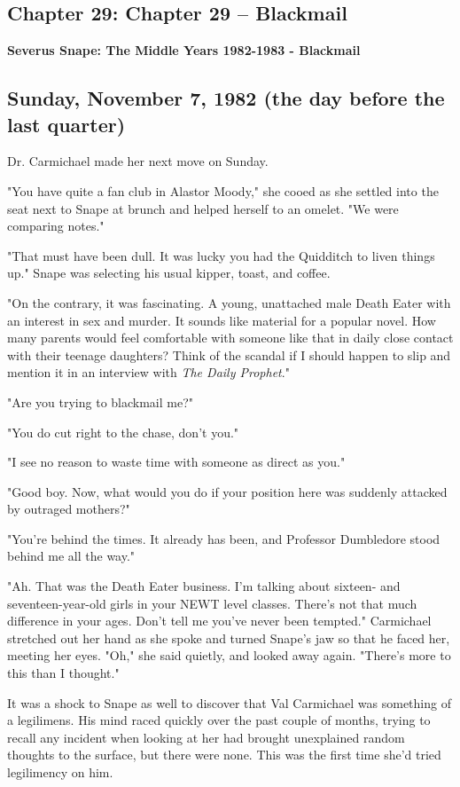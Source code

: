\documentclass[a4paper,11pt]{article}
\begin{document}
\subsection{Chapter 29: Chapter 29 – Blackmail}

\textbf{Severus Snape: The Middle Years 1982-1983 - Blackmail}

\subsection{Sunday, November 7, 1982 (the day before the last quarter)}

Dr. Carmichael made her next move on Sunday.

"You have quite a fan club in Alastor Moody," she cooed as she settled into the seat next to Snape at brunch and helped herself to an omelet. "We were comparing notes."

"That must have been dull. It was lucky you had the Quidditch to liven things up." Snape was selecting his usual kipper, toast, and coffee.

"On the contrary, it was fascinating. A young, unattached male Death Eater with an interest in sex and murder. It sounds like material for a popular novel. How many parents would feel comfortable with someone like that in daily close contact with their teenage daughters? Think of the scandal if I should happen to slip and mention it in an interview with \emph{The Daily Prophet}."

"Are you trying to blackmail me?"

"You do cut right to the chase, don't you."

"I see no reason to waste time with someone as direct as you."

"Good boy. Now, what would you do if your position here was suddenly attacked by outraged mothers?"

"You're behind the times. It already has been, and Professor Dumbledore stood behind me all the way."

"Ah. That was the Death Eater business. I'm talking about sixteen- and seventeen-year-old girls in your NEWT level classes. There's not that much difference in your ages. Don't tell me you've never been tempted." Carmichael stretched out her hand as she spoke and turned Snape's jaw so that he faced her, meeting her eyes. "Oh," she said quietly, and looked away again. "There's more to this than I thought."

It was a shock to Snape as well to discover that Val Carmichael was something of a legilimens. His mind raced quickly over the past couple of months, trying to recall any incident when looking at her had brought unexplained random thoughts to the surface, but there were none. This was the first time she'd tried legilimency on him.
\end{document}
